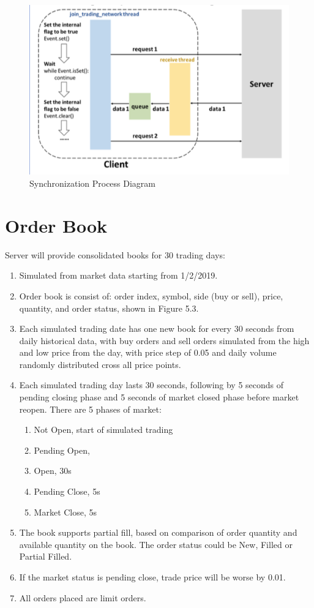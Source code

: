 \begin{figure}[h!]
\centering
\includegraphics[scale=0.5]{client_server/images/event.png}
\caption{Synchronization Process Diagram}
\label{fig:synch}
\end{figure}


\section{Order Book}
    
Server will provide consolidated books for 30 trading days: 
\begin{enumerate}
    \item Simulated from market data starting from 1/2/2019.
    \item Order book is consist of: order index, symbol, side (buy or sell), price, quantity, and order status, shown in Figure 5.3.
    \item Each simulated trading date has one new book for every 30 seconds from daily historical data, with buy orders and sell orders simulated from the high and low price from the day, with price step of 0.05 and daily volume randomly distributed cross all price points. 
    \item Each simulated trading day lasts 30 seconds, following by 5 seconds of pending closing phase and 5 seconds of market closed phase before market reopen. There are 5 phases of market: 
    \begin{enumerate}
        \item Not Open, start of simulated trading
        \item Pending Open, 
        \item Open, 30s
        \item Pending Close, 5s
        \item Market Close, 5s
    \end{enumerate}
    \item The book supports partial fill, based on comparison of order quantity and available quantity on the book. The order status could be New, Filled or Partial Filled.
    \item If the market status is pending close, trade price will be worse by 0.01.
    \item All orders placed are limit orders.
\end{enumerate}

